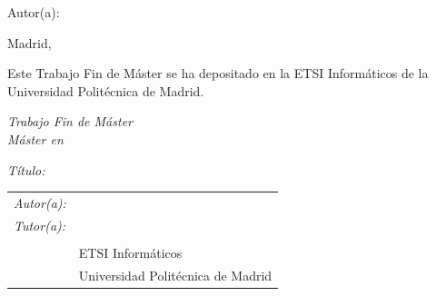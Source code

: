 \begin{titlepage}
\vspace*{0.5cm}
\begin{center}
\huge\bfseries {  \TituloTFM{} } 
\end{center}

\vspace*{5cm}

\noindent
\large{Autor(a): \NombreAutor{} }\\



\vspace*{4cm}
\begin{center}
Madrid, \fecha
\end{center}

\newpage
\thispagestyle{empty}
\noindent
Este Trabajo Fin de Máster se ha depositado en la ETSI Informáticos de la Universidad Politécnica de Madrid.

\vspace*{4cm}
\noindent
\textit{Trabajo Fin de Máster}\\
\textit{Máster en} \Master{}

\textit{Título:} \TituloTFM{}\\
\Fecha


\vspace*{7cm}

\noindent
\begin{tabular}{ll}
\textit{Autor(a):} & \NombreAutor{}  \\ 
\textit{Tutor(a):} & \NombreTutor{}  \\ 
                & \Departamento{} \\
                & ETSI Informáticos\\
                & Universidad Politécnica de Madrid
\end{tabular} 

\end{titlepage}
